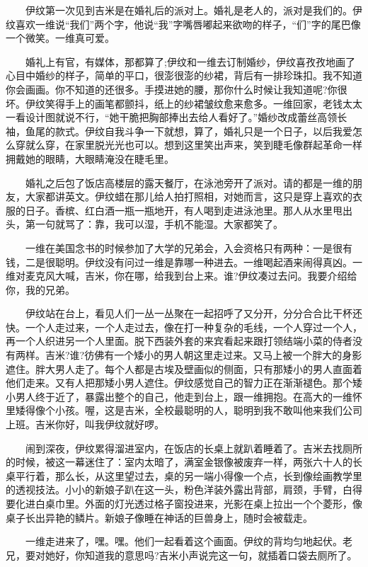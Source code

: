\documentclass[12pt,UTF8]{ctexbook}
\begin{document}
　　伊纹第一次见到吉米是在婚礼后的派对上。婚礼是老人的，派对是我们的。伊纹喜欢一维说\enquote{我们}两个字，他说\enquote{我}字嘴唇嘟起来欲吻的样子，\enquote{们}字的尾巴像一个微笑。一维真可爱。

　　婚礼上有官，有媒体，那都算了;伊纹和一维去订制婚纱，伊纹喜孜孜地画了心目中婚纱的样子，简单的平口，很澎很澎的纱裙，背后有一排珍珠扣。我不知道你会画画。你不知道的还很多。手摸进她的腰，那你什么时候让我知道呢?你很坏。伊纹笑得手上的画笔都颤抖，纸上的纱裙皱纹愈来愈多。一维回家，老钱太太一看设计图就说不行，\enquote{她干脆把胸部捧出去给人看好了。}婚纱改成蕾丝高领长袖，鱼尾的款式。伊纹自我斗争一下就想，算了，婚礼只是一个日子，以后我爱怎么穿就么穿，在家里脱光光也可以。想到这里笑出声来，笑到睫毛像群起革命一样拥戴她的眼睛，大眼睛淹没在睫毛里。

　　婚礼之后包了饭店高楼层的露天餐厅，在泳池旁开了派对。请的都是一维的朋友，大家都讲英文。伊纹蜡在那儿给人拍打照相，对她而言，这只是穿上喜欢的衣服的日子。香槟、红白酒一瓶一瓶地开，有人喝到走进泳池里。那人从水里甩出头，第一句就骂了：靠，我可以湿，手机不能湿。大家都笑了。

　　一维在美国念书的时候参加了大学的兄弟会，入会资格只有两种：一是很有钱，二是很聪明。伊纹没有问过一维是靠哪一种进去。一维喝起酒来闹得真凶。一维对麦克风大喊，吉米，你在哪，给我到台上来。谁?伊纹凑过去问。我要介绍给你，我的兄弟。

　　伊纹站在台上，看见人们一丛一丛聚在一起招呼了又分开，分分合合比干杯还快。一个人走过来，一个人走过去，像在打一种复杂的毛线，一个人穿过一个人，再一个人织进另一个人里面。脱下西装外套的来宾看起来跟打领结端小菜的侍者没有两样。吉米?谁?彷佛有一个矮小的男人朝这里走过来。又马上被一个胖大的身影遮住。胖大男人走了。每个人都是古埃及壁画似的侧面，只有那矮小的男人直面着他们走来。又有人把那矮小男人遮住。伊纹感觉自己的智力正在渐渐褪色。那个矮小男人终于近了，暴露出整个的自己，他走到台上，跟一维拥抱。在高大的一维怀里矮得像个小孩。喔，这是吉米，全校最聪明的人，聪明到我不敢叫他来我们公司上班。吉米你好，叫我伊纹就好啰。

　　闹到深夜，伊纹累得溜进室内，在饭店的长桌上就趴着睡着了。吉米去找厕所的时候，被这一幕迷住了：室内太暗了，满室金银像被废弃一样，两张六十人的长桌平行着，那么长，从这里望过去，桌的另一端小得像一个点，长到像绘画教学里的透视技法。小小的新娘子趴在这一头，粉色洋装外露出背部，肩颈，手臂，白得要化进白桌巾里。外面的灯光透过格子窗投进来，光影在桌上拉出一个个菱形，像桌子长出异艳的鳞片。新娘子像睡在神话的巨兽身上，随时会被载走。

　　一维走进来了，嘿。嘿。他们一起看着这个画面。伊纹的背均匀地起伏。老兄，要对她好，你知道我的意思吗?吉米小声说完这一句，就插着口袋去厕所了。
\end{document}
